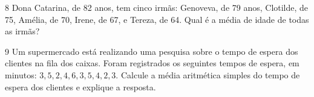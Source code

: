 \num{8} Dona Catarina, de 82 anos, tem cinco irmãs: Genoveva, de 79 anos,
Clotilde, de 75, Amélia, de 70, Irene, de 67, e Tereza, de 64. Qual é a
média de idade de todas as irmãs?



















\num{9} Um supermercado está realizando uma pesquisa sobre o tempo de espera
dos clientes na fila dos caixas. Foram registrados os seguintes tempos
de espera, em minutos: $3, 5, 2, 4, 6, 3, 5, 4, 2, 3$.
Calcule a média aritmética simples do tempo de espera dos clientes e
explique a resposta.




